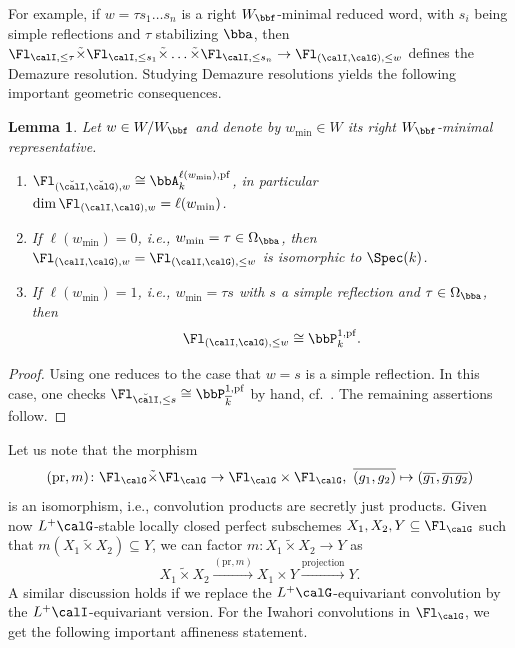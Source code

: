 \documentclass[10pt, reqno]{amsart}
\theoremstyle{plain}
\newtheorem{lemma}[theorem]{Lemma}
\theoremstyle{definition}
\numberwithin{equation}{section}
\begin{document}
	For example, if $w=\tau s_1 \dots s_n $ is a right $W_\bbf$-minimal reduced word, with $s_i$ being simple reflections and $\tau$ stabilizing $\bba$, then
	$ \Fl_{\calI,\leq \tau}\tilde{\times}\Fl_{\calI,\leq s_1} \tilde{\times} \dots \tilde{\times} \Fl_{\calI,\leq s_n}  \to \Fl_{(\calI,\calG),\leq w}$ defines the Demazure resolution.
	Studying Demazure resolutions yields the following important geometric consequences.
	
	\begin{lemma}
		\label{sec:geometry-affine-flag-3-geometric-consequences-of-demazure-resolution}
		Let $w\in W/W_\bbf$ and denote by $w_{\mathrm{min}} \in W$ its right $W_\bbf$-minimal representative.
		\begin{enumerate}
			\item $\Fl_{(\breve{\calI},\breve{\calG}),w}\cong \bbA^{\ell(w_{\mathrm{min}}),\rm{pf}}_{k}$, in particular $\dim \Fl_{(\calI,\calG),w}=\ell(w_{\mathrm{min}})$.
			\item If $\ell(w_{\mathrm{min}})=0$, i.e., $w_{\mathrm{min}}=\tau\in \Omega_{\bba}$, then $\Fl_{(\calI,\calG), w}=\Fl_{(\calI,\calG),\leq w}$ is isomorphic to $\Spec(k)$.
			\item If $\ell(w_{\mathrm{min}})=1$, i.e., $w_{\mathrm{min}}=\tau s$ with $s$ a simple reflection and $\tau\in \Omega_{\bba}$, then
			\begin{equation}
				\Fl_{(\calI,\calG),\leq w}\cong \bbP^{1,\rm{pf}}_{k}.
			\end{equation}
		\end{enumerate}
	\end{lemma}
	\begin{proof}
		Using  one reduces to the case that $w=s$ is a simple reflection. In this case, one checks $\Fl_{\breve{\calI}, \leq s}\cong \bbP^{1,\rm{pf}}_{\overline{k}}$ by hand, cf.\ \cite[Section 1.4]{Zhu17}. The remaining assertions follow.
	\end{proof}
	
	Let us note that the morphism
	\begin{equation}
		(\mathrm{pr},m)\colon \Fl_{\calG}\tilde{\times} \Fl_{\calG}\to \Fl_{\calG} \times \Fl_{\calG},\ \overline{(g_1,g_2)}\mapsto (\overline{g_1}, \overline{g_1g_2}) 
	\end{equation}
	is an isomorphism, i.e., convolution products are secretly just products. Given now $L^+\calG$-stable locally closed perfect subschemes $X_1, X_2,Y\subseteq \Fl_{\calG}$ such that $m(X_1\tilde{\times} X_2)\subseteq Y$, we can factor $	m\colon X_1\tilde{\times} X_2\to Y$ as
	\begin{equation}
		X_1\tilde{\times} X_2\xrightarrow{(\mathrm{pr},m)} X_1\times Y\xrightarrow{\mathrm{projection}} Y.
	\end{equation}
	A similar discussion holds if we replace the $L^+\calG$-equivariant convolution by the $L^+\calI$-equivariant version. For the Iwahori convolutions in $\Fl_{\calG}$, we get the following important affineness statement.
	
\end{document}
